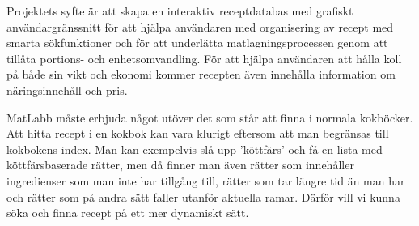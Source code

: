 Projektets syfte är att skapa en interaktiv receptdatabas med grafiskt användargränssnitt för att hjälpa användaren med organisering av recept med smarta sökfunktioner och för att underlätta matlagningsprocessen genom att tillåta portions- och enhetsomvandling. För att hjälpa användaren att hålla koll på både sin vikt och ekonomi kommer recepten även innehålla information om näringsinnehåll och pris.

MatLabb måste erbjuda något utöver det som står att finna i normala kokböcker. Att hitta recept i en kokbok kan vara klurigt eftersom att man begränsas till kokbokens index. Man kan exempelvis slå upp 'köttfärs' och få en lista med köttfärsbaserade rätter, men då finner man även rätter som innehåller ingredienser som man inte har tillgång till, rätter som tar längre tid än man har och rätter som på andra sätt faller utanför aktuella ramar. Därför vill vi kunna söka och finna recept på ett mer dynamiskt sätt.
